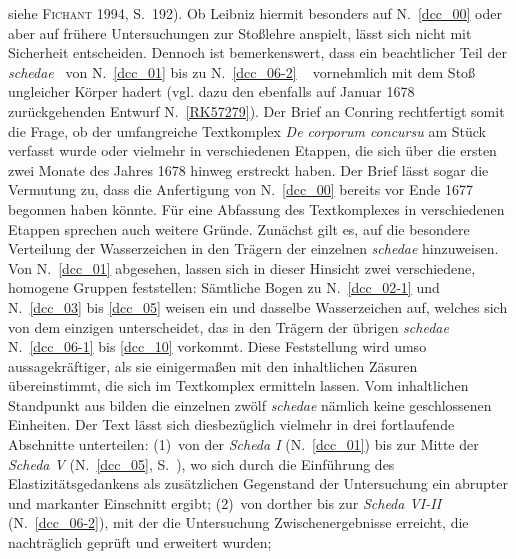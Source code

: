 siehe \textsc{Fichant} 1994, S.~192).\cite{01056}%
\protect{}%
\protect{}
Ob Leibniz hiermit besonders auf N.~\ref{dcc_00} %
oder aber auf frühere Untersuchungen zur Stoßlehre anspielt, lässt sich nicht mit Sicherheit entscheiden.
Dennoch ist bemerkenswert, dass ein beachtlicher Teil der \textit{schedae} \textendash\ von N.~\ref{dcc_01} %
bis zu N.~\ref{dcc_06-2} \textendash\ %
vornehmlich mit dem Stoß ungleicher Körper hadert
(vgl. dazu den ebenfalls auf Januar 1678 zurückgehenden Entwurf N.~\ref{RK57279}). %
Der Brief an Conring%
\protect{}
rechtfertigt somit die Frage, ob der umfangreiche Textkomplex \textit{De corporum concursu} am Stück verfasst wurde oder vielmehr in verschiedenen Etappen, die sich über die ersten zwei Monate des Jahres 1678 hinweg erstreckt haben.
Der Brief lässt sogar die Vermutung zu, dass die Anfertigung von N.~\ref{dcc_00} %
bereits vor Ende 1677 begonnen haben könnte.
\pend%
%
\pstart%
Für eine Abfassung des Textkomplexes in verschiedenen Etappen sprechen auch weitere Gründe.
Zunächst gilt es,
auf die besondere Verteilung der Wasserzeichen in den Trägern der einzelnen \textit{schedae} hinzuweisen.
Von N.~\ref{dcc_01} %
abgesehen, lassen sich in dieser Hinsicht zwei verschiedene, homogene Gruppen feststellen:
Sämtliche Bogen zu N.~\ref{dcc_02-1} %
und N.~\ref{dcc_03} %
bis \ref{dcc_05} %
weisen ein und dasselbe Wasserzeichen auf, welches sich von dem einzigen unterscheidet, das in den Trägern der übrigen \textit{schedae} N.~\ref{dcc_06-1} %
bis \ref{dcc_10} %
vorkommt.
Diese Feststellung wird umso aussagekräftiger, als sie einigermaßen mit den inhaltlichen Zäsuren übereinstimmt, die sich im Textkomplex ermitteln lassen.
Vom inhaltlichen Standpunkt aus bilden die einzelnen zwölf \textit{schedae} nämlich keine geschlossenen Einheiten.
Der Text lässt sich diesbezüglich vielmehr in drei fortlaufende Abschnitte unterteilen:
\pend%
%
\pstart%
(1)~von der \textit{Scheda I} (N.~\ref{dcc_01}) %
bis zur Mitte der \textit{Scheda V} (N.~\ref{dcc_05}, %
S.~), wo sich durch die Einführung des Elastizitätsgedankens als zusätzlichen Gegenstand der Untersuchung ein abrupter und markanter Einschnitt ergibt;
\pend%
%
\pstart%
(2)~von dorther bis zur \textit{Scheda VI-II} (N.~\ref{dcc_06-2}), %
mit der die Untersuchung Zwischenergebnisse erreicht, die nachträglich geprüft und erweitert wurden;
\pend%
%
\pstart%

